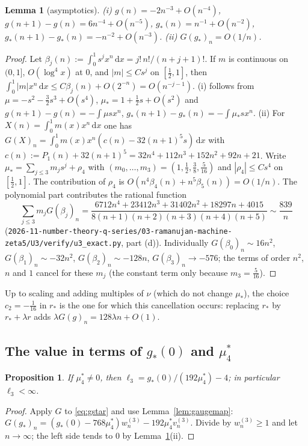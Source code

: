 \documentclass[11pt]{amsart}
\newtheorem{proposition}[theorem]{Proposition}
\newtheorem{lemma}[theorem]{Lemma}
\theoremstyle{definition}
\theoremstyle{remark}
\numberwithin{equation}{section}
\newcommand{\dd}{\,\mathrm{d}}
\newcommand{\file}[1]{\nolinkurl{2026-11-number-theory-q-series/03-ramanujan-machine-zeta5/#1}}
\begin{document}
\begin{lemma}[asymptotics]\label{lem:asym}
\textup{(i)} $g(n)=-2n^{-3}+O(n^{-4})$, $g(n+1)-g(n)=6n^{-4}+O(n^{-5})$, $g_*(n)=n^{-1}+O(n^{-2})$, $g_*(n+1)-g_*(n)=-n^{-2}+O(n^{-3})$.
\textup{(ii)} $G(g_*)_n=O(1/n)$.
\end{lemma}
\begin{proof}
Let $\beta_j(n):=\int_0^1s^jx^n\dd x=j!\,n!/(n+j+1)!$. If $m$ is continuous on $(0,1]$, $O(\log^4x)$ at $0$, and $|m|\le Cs^j$ on $[\frac12,1]$, then $\int_0^1|m|x^n\dd x\le C\beta_j(n)+O(2^{-n})=O(n^{-j-1})$.
(i) follows from $\mu=-s^2-\frac32s^3+O(s^4)$, $\mu_*=1+\frac12s+O(s^2)$ and $g(n+1)-g(n)=-\int\mu sx^n$, $g_*(n+1)-g_*(n)=-\int\mu_*sx^n$.
(ii) For $X(n)=\int_0^1m(x)x^n\dd x$ one has $G(X)_n=\int_0^1m(x)x^n(c(n)-32(n+1)^5s)\dd x$ with $c(n):=P_1(n)+32(n+1)^5=32n^4+112n^3+152n^2+92n+21$. Write $\mu_*=\sum_{j\le3}m_js^j+\rho_4$ with $(m_0,\dots,m_3)=(1,\frac12,\frac38,\frac5{16})$ and $|\rho_4|\le Cs^4$ on $[\frac12,1]$. The contribution of $\rho_4$ is $O(n^4\beta_4(n)+n^5\beta_5(n))=O(1/n)$. The polynomial part contributes the rational function
\[
\sum_{j\le3}m_jG(\beta_j)_n=\frac{6712n^4+23412n^3+31402n^2+18297n+4015}{8(n+1)(n+2)(n+3)(n+4)(n+5)}\sim\frac{839}{n}
\]
(\file{U3/verify/u3_exact.py}, part (d)). Individually $G(\beta_0)_n\sim16n^2$, $G(\beta_1)_n\sim-32n^2$, $G(\beta_2)_n\sim-128n$, $G(\beta_3)_n\to-576$; the terms of order $n^2$, $n$ and $1$ cancel for these $m_j$ (the constant term only because $m_3=\frac5{16}$).
\end{proof}

Up to scaling and adding multiples of $\nu$ (which do not change $\mu_*$), the choice $c_2=-\frac1{16}$ in $r_*$ is the one for which this cancellation occurs: replacing $r_*$ by $r_*+\lambda r$ adds $\lambda G(g)_n=128\lambda n+O(1)$.

\subsection{\texorpdfstring{The value in terms of $g_*(0)$ and $\mu_4^*$}{The value in terms of g*(0) and mu4*}}
\begin{proposition}\label{prop:ell3}
If $\mu_4^*\neq0$, then $\ell_3=g_*(0)/(192\mu_4^*)-4$; in particular $\ell_3<\infty$.
\end{proposition}
\begin{proof}
Apply $G$ to \eqref{eq:gstar} and use Lemma~\ref{lem:gaugemap}: $G(g_*)_n=(g_*(0)-768\mu_4^*)w^{(3)}_n-192\mu_4^*v^{(3)}_n$. Divide by $w^{(3)}_n\ge1$ and let $n\to\infty$; the left side tends to $0$ by Lemma~\ref{lem:asym}(ii).
\end{proof}
\end{document}
